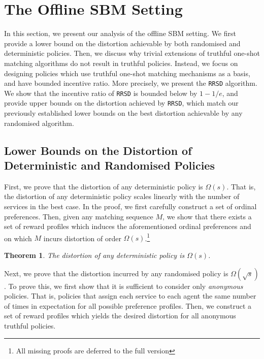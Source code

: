 \documentclass[letterpaper,11pt]{article}
\newtheorem{thm}{Theorem}
\begin{document}
\section{The Offline SBM Setting}\label{sec:offline-blockmatch}

In this section, we present our analysis of the offline SBM setting. We first provide a lower bound on the distortion achievable by both randomised and deterministic policies. Then, we discuss why trivial extensions of truthful one-shot matching algorithms do not result in truthful policies. Instead, we focus on designing policies which use truthful one-shot matching mechanisms as a basis, and have bounded incentive ratio. More precisely, we present the \texttt{RRSD} algorithm. We show that the incentive ratio of \texttt{RRSD} is bounded below by $ 1 - 1/e$, and provide upper bounds on the distortion achieved by \texttt{RRSD}, which match our previously established lower bounds on the best distortion achievable by any randomised algorithm. 

\subsection{Lower Bounds on the Distortion of Deterministic and Randomised Policies}
First, we prove that the distortion of any deterministic policy is $\Omega(s)$. That is, the distortion of any deterministic policy scales linearly with the number of services in the best case. In the proof, we first carefully construct a set of ordinal preferences. Then, given any matching sequence $M$, we show that there exists a set of reward profiles which induces the aforementioned ordinal preferences and on which $M$ incurs distortion of order $\Omega(s)$.\footnote{All missing proofs are deferred to the full version}


\begin{thm}
\label{thm: distortion of deterministic policies}
    The distortion of any deterministic policy is $\Omega(s)$.
\end{thm}

Next, we prove that the distortion incurred by any randomised policy is $\Omega(\sqrt{s})$. To prove this, we first show that it is sufficient to consider only \emph{anonymous} policies. That is, policies that assign each service to each agent the same number of times in expectation for all possible preference profiles. Then, we construct a set of reward profiles which yields the desired distortion for all anonymous truthful policies.
\end{document}
